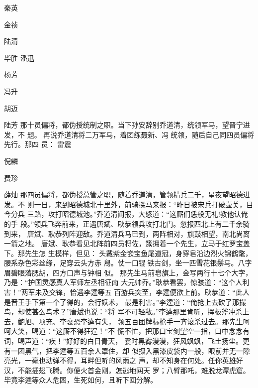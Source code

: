秦英

金祯

陆清

毕胜
潘迅

杨芳

冯升

胡迈

陆芳
那十员偏将，都伪授统制之职。当下孙安辞别乔道清，统领军马，望晋宁进发，不
题。
再说乔道清将二万军马，着团练聂新、冯统领，随后自己同四员偏将先行。那四
员：
雷震

倪麟

费珍

薛灿
那四员偏将，都伪授总管之职，随着乔道清，管领精兵二千，星夜望昭德进发。不
则一日，来到昭德城北十里外，前骑探马来报：“昨日被宋兵打破壶关，目今分兵
三路，攻打昭德城池。”乔道清闻报，大怒道：“这厮们恁般无礼!教他认俺的手
段。”领兵飞奔前来，正遇唐斌、耿恭领兵攻打北门。忽报西北上有二千余骑到来，
唐斌、耿恭列阵迎敌。乔道清兵马已到，两阵相对，旗鼓相望，南北尚离一箭之地。
唐斌、耿恭看见北阵前四员将佐，簇拥着一个先生，立马于红罗宝盖下。那先生怎
生模样，但见：
头戴紫金嵌宝鱼尾道冠，身穿皂沿边烈火锦鹤氅，腰系杂色彩丝绦，足穿云头方赤
舄。仗一口锟铁古剑，坐一匹雪花银鬃马。八字眉碧眼落腮胡，四方口声与钟相
似。
那先生马前皂旗上，金写两行十七个大字，乃是：“护国灵感真人军师左丞相征南
大元帅乔。”耿恭看罢，惊骇道：“这个人利害！”两军未及交锋，恰遇李逵等五
百游兵突至，李逵便欲上前。耿恭道：“此人是晋王手下第一个了得的，会行妖术，
最是利害。”李逵道：“俺抢上去砍了那撮鸟，却使甚么鸟术？”唐斌也说：“将
军不可轻敌。”李逵那里肯听，挥板斧冲杀上去，鲍旭、项充、李衮恐李逵有失，
领五百团牌标枪手一齐滚杀过去。那先生呵呵大笑，喝道：“这厮不得狂逞！”不
慌不忙，把那口宝剑望空一指，口中念念有词，喝声道：“疾！”好好的白日青天，
霎时黑雾漫漫，狂风飒飒，飞土扬尘。更有一团黑气，把李逵等五百余人罩住，却
似摄入黑漆皮袋内一般，眼前并无一隙亮光，一毫也动弹不得，耳畔但听的风雨之
声，却不知身在何处。任你英雄好汉，不能插翅飞腾。你便火首金刚，怎逃地网天
罗；八臂那吒，难脱龙潭虎窟。
毕竟李逵等众人危困，生死如何，且听下回分解。